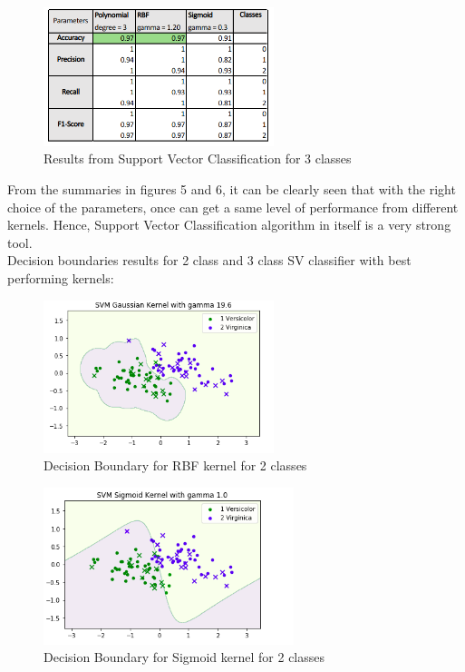 \documentclass{article}
\begin{document}
\begin{figure}[h!]
  \centering
  \includegraphics[width=0.6\textwidth]{3class_table.png}
  \caption{Results from Support Vector Classification for 3 classes}
  \label{fig:fig6}
\end{figure}
From the summaries in figures 5 and 6, it can be clearly seen that with the right choice of the parameters, once can get a same level of performance from different kernels. Hence, Support Vector Classification algorithm in itself is a very strong tool.
\\
Decision boundaries results for 2 class and 3 class SV classifier with best performing kernels:
\begin{figure}
  \centering
  \includegraphics[width=0.6\textwidth]{2class_rbf.png}
  \caption{Decision Boundary for RBF kernel for 2 classes}
  \label{fig:fig7}
\end{figure}
\begin{figure}
  \centering
  \includegraphics[width=0.65\textwidth]{2class_sigmoid.png}
  \caption{Decision Boundary for Sigmoid kernel for 2 classes}
  \label{fig:fig8}
\end{figure}
\end{document}
